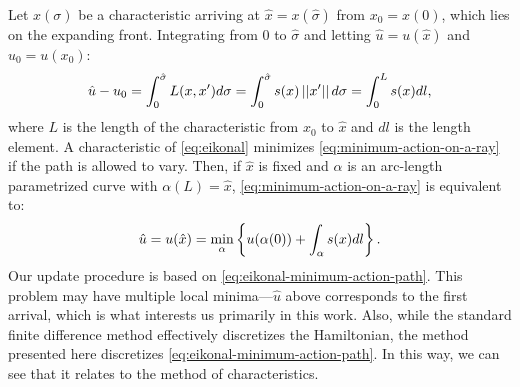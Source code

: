 \documentclass[eikonal.tex]{subfiles}
\begin{document}
Let $x(\sigma)$ be a characteristic arriving at
$\hat{x} = x(\hat\sigma)$ from $x_0 = x(0)$, which lies on the
expanding front. Integrating from $0$ to $\hat\sigma$ and letting
$\hat u = u(\hat x)$ and $u_0 = u(x_0)$:
\begin{equation}
  \label{eq:minimum-action-on-a-ray}
  \hat u - u_0 = \int_{0}^{\hat\sigma} L(x, x') d\sigma = \int_{0}^{\hat\sigma} s(x) \norm{x'} d\sigma = \int_0^L s(x) dl,
\end{equation}
where $L$ is the length of the characteristic from $x_0$ to $\hat{x}$
and $dl$ is the length element. A characteristic of \cref{eq:eikonal}
minimizes \cref{eq:minimum-action-on-a-ray} if the path is allowed to
vary. Then, if $\hat{x}$ is fixed and $\alpha$ is an arc-length
parametrized curve with $\alpha(L) = \hat{x}$,
\cref{eq:minimum-action-on-a-ray} is equivalent to:
\begin{equation}\label{eq:eikonal-minimum-action-path}
  \hat{u} = u(\hat{x}) = \min_\alpha \curlyb{u(\alpha(0)) + \int_\alpha s(x) dl}.
\end{equation}
Our update procedure is based on
\cref{eq:eikonal-minimum-action-path}. This problem may have multiple
local minima---$\hat{u}$ above corresponds to the first arrival, which
is what interests us primarily in this work. Also, while the standard
finite difference method effectively discretizes the Hamiltonian, the
method presented here discretizes
\cref{eq:eikonal-minimum-action-path}. In this way, we can see that it
relates to the method of characteristics.
\end{document}
